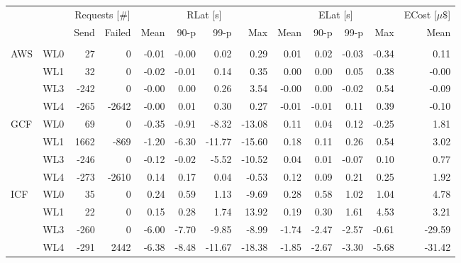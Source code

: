 \begin{tabular}{llrrrrrrrrrrr}
\toprule
    &     & \multicolumn{2}{c}{Requests [\#]} & \multicolumn{4}{c}{RLat [s]} & \multicolumn{4}{c}{ELat [s]} & ECost [$\mu\$$] \\
    &     &          Send & Failed &     Mean &  90-p &   99-p &    Max &     Mean &  90-p &  99-p &   Max &            Mean \\
{} &   &               &        &          &       &        &        &          &       &       &       &                 \\
\midrule
AWS & WL0 &            27 &      0 &    -0.01 & -0.00 &   0.02 &   0.29 &     0.01 &  0.02 & -0.03 & -0.34 &            0.11 \\
    & WL1 &            32 &      0 &    -0.02 & -0.01 &   0.14 &   0.35 &     0.00 &  0.00 &  0.05 &  0.38 &           -0.00 \\
    & WL3 &          -242 &      0 &    -0.00 &  0.00 &   0.26 &   3.54 &    -0.00 &  0.00 & -0.02 &  0.54 &           -0.09 \\
    & WL4 &          -265 &  -2642 &    -0.00 &  0.01 &   0.30 &   0.27 &    -0.01 & -0.01 &  0.11 &  0.39 &           -0.10 \\
GCF & WL0 &            69 &      0 &    -0.35 & -0.91 &  -8.32 & -13.08 &     0.11 &  0.04 &  0.12 & -0.25 &            1.81 \\
    & WL1 &          1662 &   -869 &    -1.20 & -6.30 & -11.77 & -15.60 &     0.18 &  0.11 &  0.26 &  0.54 &            3.02 \\
    & WL3 &          -246 &      0 &    -0.12 & -0.02 &  -5.52 & -10.52 &     0.04 &  0.01 & -0.07 &  0.10 &            0.77 \\
    & WL4 &          -273 &  -2610 &     0.14 &  0.17 &   0.04 &  -0.53 &     0.12 &  0.09 &  0.21 &  0.25 &            1.92 \\
ICF & WL0 &            35 &      0 &     0.24 &  0.59 &   1.13 &  -9.69 &     0.28 &  0.58 &  1.02 &  1.04 &            4.78 \\
    & WL1 &            22 &      0 &     0.15 &  0.28 &   1.74 &  13.92 &     0.19 &  0.30 &  1.61 &  4.53 &            3.21 \\
    & WL3 &          -260 &      0 &    -6.00 & -7.70 &  -9.85 &  -8.99 &    -1.74 & -2.47 & -2.57 & -0.61 &          -29.59 \\
    & WL4 &          -291 &   2442 &    -6.38 & -8.48 & -11.67 & -18.38 &    -1.85 & -2.67 & -3.30 & -5.68 &          -31.42 \\
\bottomrule
\end{tabular}
